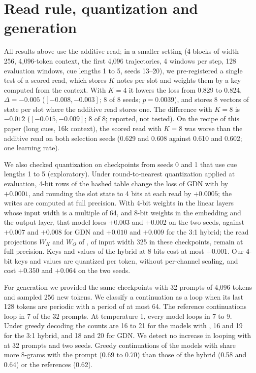 \begin{table}[!htb]
\centering
\footnotesize

\caption{Loss by learning rate on the selection seeds, at 164M training tokens (328M for 16 blocks
of width 512), 16k context. An entry of n/a marks a run that was not made or was lost to a host
failure.}
\label{tab:lr}
\end{table}

\section{Read rule, quantization and generation}
\label{app:other}

All results above use the additive read; in a smaller setting (4 blocks of width 256, 4,096-token
context, the first 4,096 trajectories, 4 windows per step, 128 evaluation windows, cue lengths 1
to 5, seeds 13--20), we pre-registered a single test of a scored read,
which stores $K$ notes per slot and weights them by a key computed from the context. With $K = 4$
it lowers the loss from 0.829 to 0.824, $\Delta = -0.005$ ($[-0.008, -0.003]$; 8 of 8 seeds;
$p = 0.0039$), and stores 8 vectors of state per slot where the additive read stores one. The
difference with $K = 8$ is $-0.012$ ($[-0.015, -0.009]$; 8 of 8; reported, not tested). On the
recipe of this paper (long cues, 16k context), the scored read with $K = 8$ was worse than the
additive read on both selection seeds (0.629 and 0.608 against 0.610 and 0.602; one learning rate).

We also checked quantization on checkpoints from seeds 0 and 1 that use cue lengths 1 to 5
(exploratory). Under round-to-nearest quantization applied at evaluation, 4-bit rows of the hashed
table change the loss of GDN with \ingram{} by $+0.0001$, and rounding the slot state to 4 bits at
each read by $+0.0005$; the writes are computed at full precision. With 4-bit weights in the
linear layers whose input width is a multiple of 64, and 8-bit weights in the embedding and the
output layer, that model loses $+0.003$ and $+0.002$ on the two seeds, against $+0.007$ and
$+0.008$ for GDN and $+0.010$ and $+0.009$ for the 3:1 hybrid; the read projections $W_K$ and $W_O$ of
\ingram{}, of input width 325 in these checkpoints, remain at full precision. Keys and values of the hybrid at 8 bits cost at most $+0.001$. Our
4-bit keys and values are quantized per token, without per-channel scaling, and cost $+0.350$ and
$+0.064$ on the two seeds.

For generation we provided the same checkpoints with 32 prompts of 4,096 tokens and sampled 256
new tokens.
We classify a continuation as a loop when its last 128 tokens are periodic with a period of at most
64. The reference continuations loop in 7 of the 32 prompts. At temperature 1, every model loops
in 7 to 9. Under greedy decoding the counts are 16 to 21 for the models with \ingram{}, 16 and 19
for the 3:1 hybrid, and 18 and 20 for GDN. We detect no increase in looping with \ingram{}
at 32 prompts and two seeds. Greedy continuations of the models with \ingram{} share more 8-grams
with the prompt (0.69 to 0.70) than those of the hybrid (0.58 and 0.64) or the references (0.62).

